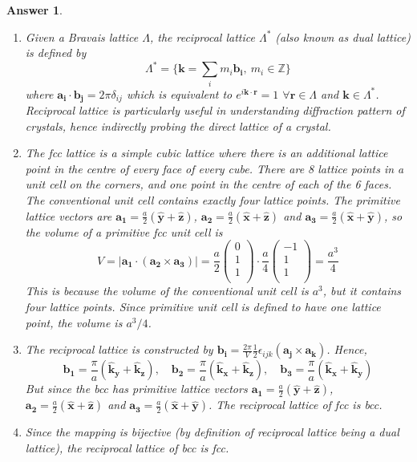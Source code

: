 \documentclass[a4paper]{article}
\newtheorem{ans}{Answer}[section]
\theoremstyle{new}
\begin{document}
\begin{ans}\leavevmode
\begin{enumerate}[label=(\alph*)]
\item Given a Bravais lattice $\Lambda$, the reciprocal lattice $\Lambda^*$ (also known as dual lattice) is defined by
$$\Lambda^*=\bigg\{\mathbf{k}=\sum_im_i\mathbf{b_i},~m_i\in\mathbb{Z}\bigg\}$$
where $\mathbf{a_i}\cdot\mathbf{b_j}=2\pi\delta_{ij}$ which is equivalent to $e^{i\mathbf{k}\cdot\mathbf{r}}=1$ $\forall\mathbf{r}\in\Lambda$ and $\mathbf{k}\in\Lambda^*$. Reciprocal lattice is particularly useful in understanding diffraction pattern of crystals, hence indirectly probing the direct lattice of a crystal.
\item The fcc lattice is a simple cubic lattice where there is an additional lattice point in the centre of every face of every cube. There are 8 lattice points in a unit cell on the corners, and one point in the centre of each of the 6 faces. The conventional unit cell contains exactly four lattice points. The primitive lattice vectors are $\mathbf{a_1}=\frac{a}{2}(\mathbf{\hat{y}}+\mathbf{\hat{z}})$, $\mathbf{a_2}=\frac{a}{2}(\mathbf{\hat{x}}+\mathbf{\hat{z}})$ and $\mathbf{a_3}=\frac{a}{2}(\mathbf{\hat{x}}+\mathbf{\hat{y}})$, so the volume of a primitive fcc unit cell is 
$$V=|\mathbf{a_1}\cdot(\mathbf{a_2}\times\mathbf{a_3})|=\frac{a}{2}\begin{pmatrix}0\\1\\1\\\end{pmatrix}\cdot\frac{a}{4}\begin{pmatrix}-1\\1\\1\\\end{pmatrix}=\frac{a^3}{4}$$
This is because the volume of the conventional unit cell is $a^3$, but it contains four lattice points. Since primitive unit cell is defined to have one lattice point, the volume is $a^3/4$.
\item The reciprocal lattice is constructed by $\mathbf{b_i}=\frac{2\pi}{V}\frac{1}{2}\epsilon_{ijk}(\mathbf{a_j}\times\mathbf{a_k})$. Hence, $$\mathbf{b_1}=\frac{\pi}{a}(\mathbf{\hat{k}_y}+\mathbf{\hat{k}_z}),\quad\mathbf{b_2}=\frac{\pi}{a}(\mathbf{\hat{k}_x}+\mathbf{\hat{k}_z}),\quad\mathbf{b_3}=\frac{\pi}{a}(\mathbf{\hat{k}_x}+\mathbf{\hat{k}_y})$$
But since the bcc has primitive lattice vectors $\mathbf{a_1}=\frac{a}{2}(\mathbf{\hat{y}}+\mathbf{\hat{z}})$, $\mathbf{a_2}=\frac{a}{2}(\mathbf{\hat{x}}+\mathbf{\hat{z}})$ and $\mathbf{a_3}=\frac{a}{2}(\mathbf{\hat{x}}+\mathbf{\hat{y}})$. The reciprocal lattice of fcc is bcc.
\item Since the mapping is bijective (by definition of reciprocal lattice being a dual lattice), the reciprocal lattice of bcc is fcc.
\end{enumerate}
\end{ans}
\newpage
\end{document}
